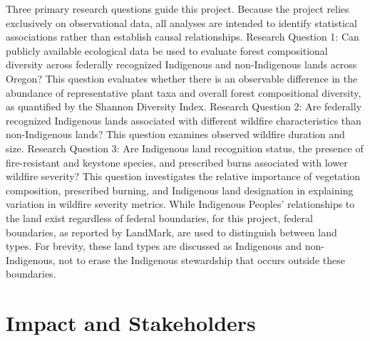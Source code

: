 \documentclass[
  letterpaper,
  DIV=11,
  numbers=noendperiod]{scrartcl}
\begin{document}
Three primary research questions guide this project. Because the project
relies exclusively on observational data, all analyses are intended to
identify statistical associations rather than establish causal
relationships. \hspace{0pt} Research Question 1: Can publicly available
ecological data be used to evaluate forest compositional diversity
across federally recognized Indigenous and non-Indigenous lands across
Oregon? This question evaluates whether there is an observable
difference in the abundance of representative plant taxa and overall
forest compositional diversity, as quantified by the Shannon Diversity
Index. \hspace{0pt} Research Question 2: Are federally recognized
Indigenous lands associated with different wildfire characteristics than
non-Indigenous lands? This question examines observed wildfire duration
and size. \hspace{0pt} Research Question 3: Are Indigenous land
recognition status, the presence of fire-resistant and keystone species,
and prescribed burns associated with lower wildfire severity? This
question investigates the relative importance of vegetation composition,
prescribed burning, and Indigenous land designation in explaining
variation in wildfire severity metrics. \hspace{0pt} While Indigenous
Peoples' relationships to the land exist regardless of federal
boundaries, for this project, federal boundaries, as reported by
LandMark, are used to distinguish between land types. For brevity, these
land types are discussed as Indigenous and non-Indigenous, not to erase
the Indigenous stewardship that occurs outside these boundaries.

\section{Impact and Stakeholders}\label{impact-and-stakeholders}
\end{document}
